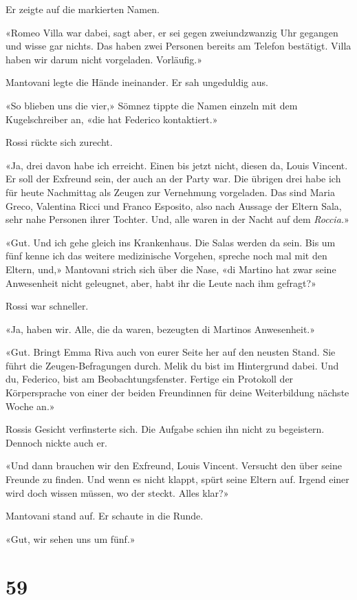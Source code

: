 Er zeigte auf die markierten Namen.

«Romeo Villa war dabei, sagt aber, er sei gegen zweiundzwanzig Uhr
gegangen und wisse gar nichts. Das haben zwei Personen bereits am
Telefon bestätigt. Villa haben wir darum nicht vorgeladen. Vorläufig.»

Mantovani legte die Hände ineinander. Er sah ungeduldig aus.

«So blieben uns die vier,» Sömnez tippte die Namen einzeln mit dem
Kugelschreiber an, «die hat Federico kontaktiert.»

Rossi rückte sich zurecht.

«Ja, drei davon habe ich erreicht. Einen bis jetzt nicht, diesen da,
Louis Vincent. Er soll der Exfreund sein, der auch an der Party war. Die
übrigen drei habe ich für heute Nachmittag als Zeugen zur Vernehmung
vorgeladen. Das sind Maria Greco, Valentina Ricci und Franco Esposito,
also nach Aussage der Eltern Sala, sehr nahe Personen ihrer Tochter.
Und, alle waren in der Nacht auf dem \emph{Roccia.}»

«Gut. Und ich gehe gleich ins Krankenhaus. Die Salas werden da sein. Bis
um fünf kenne ich das weitere medizinische Vorgehen, spreche noch mal
mit den Eltern, und,» Mantovani strich sich über die Nase, «di Martino
hat zwar seine Anwesenheit nicht geleugnet, aber, habt ihr die Leute
nach ihm gefragt?»

Rossi war schneller.

«Ja, haben wir. Alle, die da waren, bezeugten di Martinos Anwesenheit.»

«Gut. Bringt Emma Riva auch von eurer Seite her auf den neusten Stand.
Sie führt die Zeugen-Befragungen durch. Melik du bist im Hintergrund
dabei. Und du, Federico, bist am Beobachtungsfenster. Fertige ein
Protokoll der Körpersprache von einer der beiden Freundinnen für deine
Weiterbildung nächste Woche an.»

Rossis Gesicht verfinsterte sich. Die Aufgabe schien ihn nicht zu
begeistern. Dennoch nickte auch er.

«Und dann brauchen wir den Exfreund, Louis Vincent. Versucht den über
seine Freunde zu finden. Und wenn es nicht klappt, spürt seine Eltern
auf. Irgend einer wird doch wissen müssen, wo der steckt. Alles klar?»

Mantovani stand auf. Er schaute in die Runde.

«Gut, wir sehen uns um fünf.»

\chapter{59}\label{section-59}

